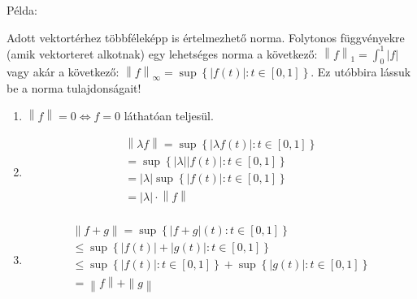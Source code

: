 \documentclass[12pt,a4paper]{scrartcl}
\providecommand{\tightlist}{%
  \setlength{\itemsep}{0pt}\setlength{\parskip}{0pt}}
\newenvironment{pelda}{}{}
\begin{document}
\begin{pelda}

Példa:

Adott vektortérhez többféleképp is értelmezhető norma. Folytonos
függvényekre (amik vektorteret alkotnak) egy lehetséges norma a
következő: \(\left\| f \right\|_{1} = {\int_{0}^{1}\left| f \right|}\)
vagy akár a következő:
\(\left\| f \right\|_{\infty} = \sup\left\{ {\left| {f\left( t \right)} \right|:t \in \left\lbrack 0,1 \right\rbrack} \right\}\).
Ez utóbbira lássuk be a norma tulajdonságait!

\begin{enumerate}
\def\labelenumi{\arabic{enumi}.}
\tightlist
\item
  \(\left. \left\| f \right\| = 0\Leftrightarrow f = 0 \right.\)
  láthatóan teljesül.
\item
  \[\begin{array}{l}
  {\left\| {\lambda f} \right\| = \sup\left\{ {\left| {\lambda f\left( t \right)} \right|:t \in \left\lbrack 0,1 \right\rbrack} \right\}} \\
  {= \sup\left\{ {\left| \lambda \right|\left| {f\left( t \right)} \right|:t \in \left\lbrack 0,1 \right\rbrack} \right\}} \\
  {= \left| \lambda \right|\sup\left\{ {\left| {f\left( t \right)} \right|:t \in \left\lbrack 0,1 \right\rbrack} \right\}} \\
  {= \left| \lambda \right| \cdot \left\| f \right\|} \\
  \end{array}\]
\item
  \[\begin{array}{l}
  {\left\| f + g \right\| = \sup\left\{ {\left| {f + g} \right|\left( t \right):t \in \left\lbrack 0,1 \right\rbrack} \right\}} \\
  {\leq \sup\left\{ {\left| {f\left( t \right)} \right| + \left| {g\left( t \right)} \right|:t \in \left\lbrack 0,1 \right\rbrack} \right\}} \\
  {\leq \sup\left\{ {\left| {f\left( t \right)} \right|:t \in \left\lbrack 0,1 \right\rbrack} \right\} + \sup\left\{ {\left| {g\left( t \right)} \right|:t \in \left\lbrack 0,1 \right\rbrack} \right\}} \\
  {\left. {} = {} \right\|\left. f \right\|\left. + \right\|\left. g \right\|} \\
  \end{array}\]
\end{enumerate}

\end{pelda}
\end{document}
